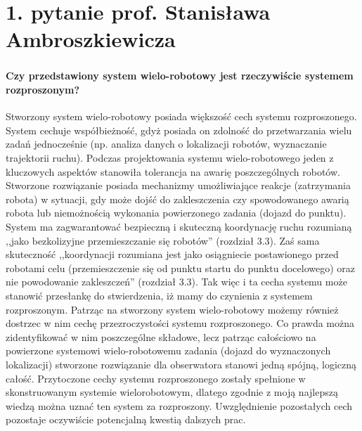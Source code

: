 \section*{1. pytanie prof. Stanisława Ambroszkiewicza}
\begin{frame}
\frametitle{\secname}
\framesubtitle{Czy przedstawiony  system wielo-robotowy jest rzeczywiście systemem rozproszonym?}
\tiny

Stworzony system wielo-robotowy posiada większość cech systemu rozproszonego. System cechuje współbieżność, gdyż posiada on zdolność do przetwarzania wielu zadań jednocześnie (np. analiza danych o lokalizacji robotów, wyznaczanie trajektorii ruchu). 
\newline
\newline
Podczas projektowania systemu wielo-robotowego jeden z kluczowych aspektów stanowiła tolerancja na awarię poszczególnych robotów. Stworzone rozwiązanie posiada mechanizmy umożliwiające reakcje (zatrzymania robota) w sytuacji, gdy może dojść do zakleszczenia czy spowodowanego awarią robota lub niemożnością wykonania powierzonego zadania (dojazd do punktu). System ma zagwarantować bezpieczną i skuteczną koordynację ruchu rozumianą ,,jako bezkolizyjne przemieszczanie się robotów'' (rozdział 3.3). Zaś sama skuteczność ,,koordynacji rozumiana jest jako osiągniecie postawionego przed robotami celu (przemieszczenie się od punktu startu do punktu docelowego) oraz nie powodowanie zakleszczeń'' (rozdział 3.3). Tak więc i ta cecha systemu może stanowić przesłankę do stwierdzenia, iż mamy do czynienia z systemem rozproszonym.
\newline
\newline
Patrząc na stworzony system wielo-robotowy możemy również dostrzec w nim cechę  przezroczystości systemu rozproszonego. Co prawda można zidentyfikować w nim poszczególne składowe, lecz patrząc całościowo na powierzone systemowi wielo-robotowemu zadania (dojazd do wyznaczonych lokalizacji) stworzone rozwiązanie dla obserwatora stanowi jedną spójną,  logiczną całość. 
\newline
\newline
Przytoczone cechy systemu rozproszonego zostały spełnione w skonstruowanym systemie wielorobotowym, dlatego zgodnie z moją najlepszą wiedzą można uznać ten system za rozproszony. Uwzględnienie pozostałych cech pozostaje oczywiście potencjalną kwestią dalszych prac.
\end{frame}





